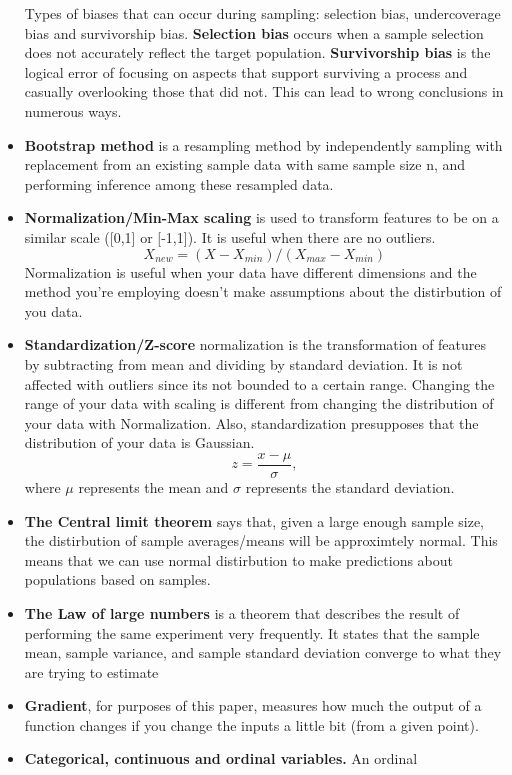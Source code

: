 \documentclass[
  letterpaper,
]{book}
\begin{document}
\begin{itemize}
  Types of biases that can occur during sampling: selection bias,
  undercoverage bias and survivorship bias. \textbf{Selection bias}
  occurs when a sample selection does not accurately reflect the target
  population. \textbf{Survivorship bias} is the logical error of
  focusing on aspects that support surviving a process and casually
  overlooking those that did not. This can lead to wrong conclusions in
  numerous ways.
\item
  \textbf{Bootstrap method} is a resampling method by independently
  sampling with replacement from an existing sample data with same
  sample size n, and performing inference among these resampled data.
\item
  \textbf{Normalization/Min-Max scaling} is used to transform features
  to be on a similar scale ({[}0,1{]} or {[}-1,1{]}). It is useful when
  there are no outliers.
  \[ X_{new} = (X - X_{min}) / (X_{max} - X_{min}) \] Normalization is
  useful when your data have different dimensions and the method you're
  employing doesn't make assumptions about the distirbution of you data.
\item
  \textbf{Standardization/Z-score} normalization is the transformation
  of features by subtracting from mean and dividing by standard
  deviation. It is not affected with outliers since its not bounded to a
  certain range. Changing the range of your data with scaling is
  different from changing the distribution of your data with
  Normalization. Also, standardization presupposes that the distribution
  of your data is Gaussian. \[ z = \frac{x-\mu}{\sigma}, \] where
  \(\mu\) represents the mean and \(\sigma\) represents the standard
  deviation.
\item
  \textbf{The Central limit theorem} says that, given a large enough
  sample size, the distirbution of sample averages/means will be
  approximtely normal. This means that we can use normal distirbution to
  make predictions about populations based on samples.
\item
  \textbf{The Law of large numbers} is a theorem that describes the
  result of performing the same experiment very frequently. It states
  that the sample mean, sample variance, and sample standard deviation
  converge to what they are trying to estimate
\item
  \textbf{Gradient}, for purposes of this paper, measures how much the
  output of a function changes if you change the inputs a little bit
  (from a given point).
\item
  \textbf{Categorical, continuous and ordinal variables.} An ordinal

\end{itemize}
\end{document}
